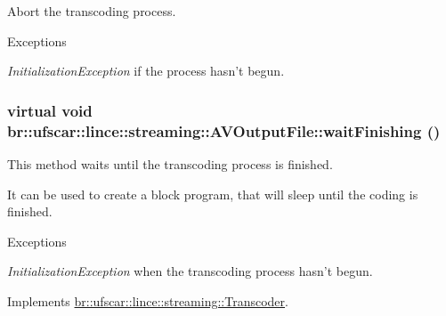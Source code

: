Abort the transcoding process. 


\begin{DoxyExceptions}{Exceptions}
\item[{\em InitializationException}]if the process hasn't begun. \end{DoxyExceptions}
\hypertarget{classbr_1_1ufscar_1_1lince_1_1streaming_1_1AVOutputFile_acd69fe24c54d43ae5add25e3917286bb}{
\subsubsection[{waitFinishing}]{\setlength{\rightskip}{0pt plus 5cm}virtual void br::ufscar::lince::streaming::AVOutputFile::waitFinishing ()}}
\label{classbr_1_1ufscar_1_1lince_1_1streaming_1_1AVOutputFile_acd69fe24c54d43ae5add25e3917286bb}


This method waits until the transcoding process is finished. 

It can be used to create a block program, that will sleep until the coding is finished. 
\begin{DoxyExceptions}{Exceptions}
\item[{\em InitializationException}]when the transcoding process hasn't begun. \end{DoxyExceptions}


Implements \hyperlink{classbr_1_1ufscar_1_1lince_1_1streaming_1_1Transcoder_abec1e8b2d9e04e79bf878206a70df2d9}{br::ufscar::lince::streaming::Transcoder}.



